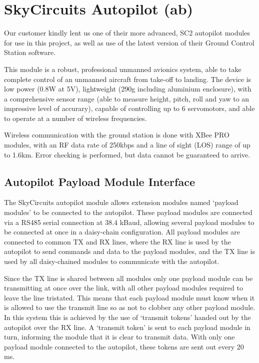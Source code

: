 \section{SkyCircuits Autopilot (ab)}

Our customer kindly lent us one of their more advanced, SC2 autopilot modules 
for use in this project, as well as use of the latest version of their Ground 
Control Station software.

This module \cite{SC2} is a robust, professional unmanned avionics system, 
able to take complete control of an unmanned aircraft from take-off to landing. 
The device is low power (0.8W at 5V), lightweight (290g including aluminium 
enclosure), with a comprehensive sensor range (able to measure height, pitch, 
roll and yaw to an impressive level of accurary), capable of controlling up to 
6 servomotors, and able to operate at a number of wireless frequencies.

Wireless communication with the ground station is done with 
XBee PRO modules, with an RF data rate of 250kbps and a 
line of sight (LOS) range of up to 1.6km. Error checking is 
performed, but data cannot be guaranteed to arrive.

\subsection{Autopilot Payload Module Interface}
\label{sec:autopilot_payload_interface}

The SkyCircuits autopilot module allows extension modules named `payload 
modules' to be connected to the autopilot. These payload modules are connected 
via a RS485 serial connection at 38.4 kBaud, allowing several payload modules
to be connected at once in a daisy-chain configuration. All payload modules are 
connected to common TX and RX lines, where the RX line is used by the
autopilot to send commands and data to the payload modules, and the TX
line is used by all daisy-chained modules to communicate with the autopilot.

Since the TX line is shared between all modules only one payload module can be 
transmitting at once over the link, with all other payload modules required to
leave the line tristated. This means that each payload module must know when it is
allowed to use the transmit line so as not to clobber any other payload module.
In this system this is achieved by the use of `transmit tokens' handed out 
by the autopilot over the RX line. A `transmit token' is sent to each payload 
module in turn, informing the module that it is clear to transmit data. With 
only one payload module connected to the autopilot, these tokens are sent out 
every 20 ms.

